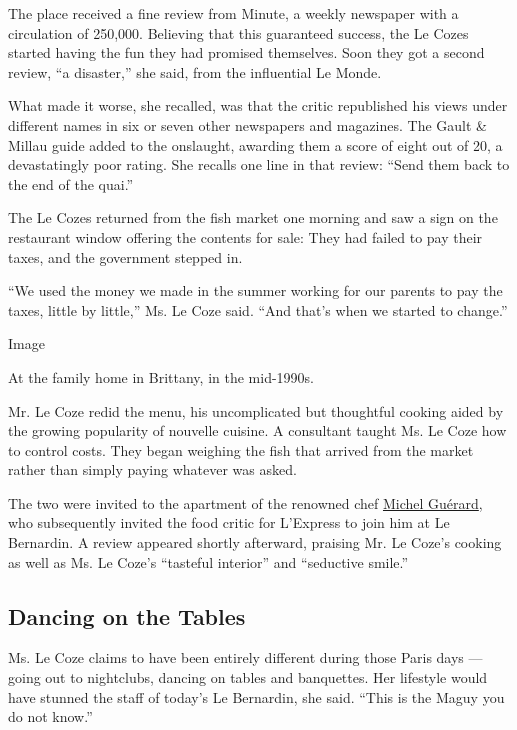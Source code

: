 The place received a fine review from Minute, a weekly newspaper with a
circulation of 250,000. Believing that this guaranteed success, the Le
Cozes started having the fun they had promised themselves. Soon they got
a second review, ``a disaster,'' she said, from the influential Le
Monde.

What made it worse, she recalled, was that the critic republished his
views under different names in six or seven other newspapers and
magazines. The Gault \& Millau guide added to the onslaught, awarding
them a score of eight out of 20, a devastatingly poor rating. She
recalls one line in that review: ``Send them back to the end of the
quai.''

The Le Cozes returned from the fish market one morning and saw a sign on
the restaurant window offering the contents for sale: They had failed to
pay their taxes, and the government stepped in.

``We used the money we made in the summer working for our parents to pay
the taxes, little by little,'' Ms. Le Coze said. ``And that's when we
started to change.''

Image

At the family home in Brittany, in the mid-1990s.

Mr. Le Coze redid the menu, his uncomplicated but thoughtful cooking
aided by the growing popularity of nouvelle cuisine. A consultant taught
Ms. Le Coze how to control costs. They began weighing the fish that
arrived from the market rather than simply paying whatever was asked.

The two were invited to the apartment of the renowned chef
\href{https://www.nytimes3xbfgragh.onion/1992/02/09/magazine/food-regarding-guerard.html}{Michel
Guérard}, who subsequently invited the food critic for L'Express to join
him at Le Bernardin. A review appeared shortly afterward, praising Mr.
Le Coze's cooking as well as Ms. Le Coze's ``tasteful interior'' and
``seductive smile.''

\hypertarget{dancing-on-the-tables}{%
\subsection{Dancing on the Tables}\label{dancing-on-the-tables}}

Ms. Le Coze claims to have been entirely different during those Paris
days --- going out to nightclubs, dancing on tables and banquettes. Her
lifestyle would have stunned the staff of today's Le Bernardin, she
said. ``This is the Maguy you do not know.''

